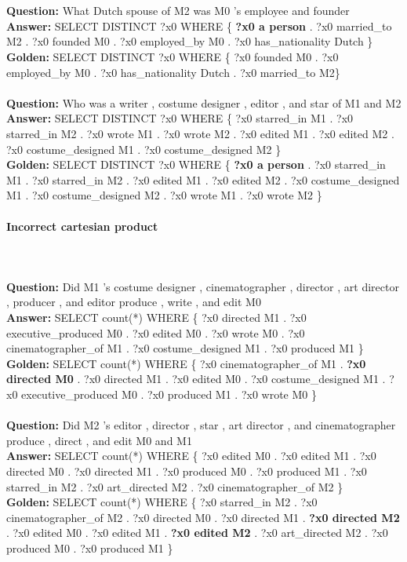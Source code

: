 \documentclass{article} \usepackage{iclr2022_conference,times}
\newcommand{\prompt}[1]{{\footnotesize \textsf{#1}}}
\begin{document}
\prompt{\\
\\
\textbf{Question:} What Dutch spouse of M2 was M0 's employee and founder\\
\textbf{Answer:} SELECT DISTINCT ?x0 WHERE \{ \textbf{?x0 a person} . ?x0 married\_to M2 . ?x0 founded M0 . ?x0 employed\_by M0 . ?x0 has\_nationality Dutch \} \\
\textbf{Golden:} SELECT DISTINCT ?x0 WHERE \{ ?x0 founded M0 . ?x0 employed\_by M0 . ?x0 has\_nationality Dutch . ?x0 married\_to M2\}\\
\\
\textbf{Question:} Who was a writer , costume designer , editor , and star of M1 and M2\\
\textbf{Answer:} SELECT DISTINCT ?x0 WHERE \{ ?x0 starred\_in M1 . ?x0 starred\_in M2 . ?x0 wrote M1 . ?x0 wrote M2 . ?x0 edited M1 . ?x0 edited M2 . ?x0 costume\_designed M1 . ?x0 costume\_designed M2 \}\\
\textbf{Golden:} SELECT DISTINCT ?x0 WHERE \{ \textbf{?x0 a person} . ?x0 starred\_in M1 . ?x0 starred\_in M2 . ?x0 edited M1 . ?x0 edited M2 . ?x0 costume\_designed M1 . ?x0 costume\_designed M2 . ?x0 wrote M1 . ?x0 wrote M2 \}
}

\paragraph{Incorrect cartesian product}

\prompt{\\
\\
\textbf{Question:} Did M1 's costume designer , cinematographer , director , art director , producer , and editor produce , write , and edit M0\\
\textbf{Answer:} SELECT count(*) WHERE \{ ?x0 directed M1 . ?x0 executive\_produced M0 . ?x0 edited M0 . ?x0 wrote M0 . ?x0 cinematographer\_of M1 . ?x0 costume\_designed M1 . ?x0 produced M1 \} \\
\textbf{Golden:} SELECT count(*) WHERE \{ ?x0 cinematographer\_of M1 . \textbf{?x0 directed M0} . ?x0 directed M1 . ?x0 edited M0 . ?x0 costume\_designed M1 . ?x0 executive\_produced M0 . ?x0 produced M1 . ?x0 wrote M0 \}\\
\\
\textbf{Question:} Did M2 's editor , director , star , art director , and cinematographer produce , direct , and edit M0 and M1\\
\textbf{Answer:} SELECT count(*) WHERE \{ ?x0 edited M0 . ?x0 edited M1 . ?x0 directed M0 . ?x0 directed M1 . ?x0 produced M0 . ?x0 produced M1 . ?x0 starred\_in M2 . ?x0 art\_directed M2 . ?x0 cinematographer\_of M2 \}\\
\textbf{Golden:} SELECT count(*) WHERE \{ ?x0 starred\_in M2 . ?x0 cinematographer\_of M2 . ?x0 directed M0 . ?x0 directed M1 . \textbf{?x0 directed M2} . ?x0 edited M0 . ?x0 edited M1 . \textbf{?x0 edited M2} . ?x0 art\_directed M2 . ?x0 produced M0 . ?x0 produced M1 \}
}
\end{document}

